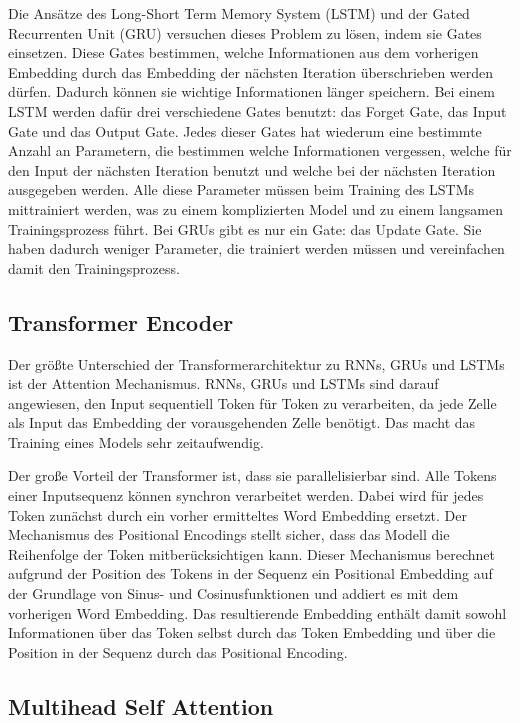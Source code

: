 Die Ansätze des Long-Short Term Memory System (LSTM) und der Gated Recurrenten Unit (GRU) versuchen dieses Problem zu lösen, indem sie Gates einsetzen.
Diese Gates bestimmen, welche Informationen aus dem vorherigen Embedding durch das Embedding der nächsten Iteration überschrieben werden dürfen.
Dadurch können sie wichtige Informationen länger speichern.
Bei einem LSTM werden dafür drei verschiedene Gates benutzt: das Forget Gate, das Input Gate und das Output Gate.
Jedes dieser Gates hat wiederum eine bestimmte Anzahl an Parametern, die bestimmen welche Informationen vergessen, welche für den Input der nächsten Iteration benutzt und welche bei der nächsten Iteration ausgegeben werden.
Alle diese Parameter müssen beim Training des LSTMs mittrainiert werden, was zu einem komplizierten Model und zu einem langsamen Trainingsprozess führt.
Bei GRUs gibt es nur ein Gate: das Update Gate.
Sie haben dadurch weniger Parameter, die trainiert werden müssen und vereinfachen damit den Trainingsprozess.~\cite{pirani2022}

\subsection{Transformer Encoder}

Der größte Unterschied der Transformerarchitektur zu RNNs, GRUs und LSTMs ist der Attention Mechanismus.
RNNs, GRUs und LSTMs sind darauf angewiesen, den Input sequentiell Token für Token zu verarbeiten, da jede Zelle als Input das Embedding der vorausgehenden Zelle benötigt.
Das macht das Training eines Models sehr zeitaufwendig.

Der große Vorteil der Transformer ist, dass sie parallelisierbar sind.
Alle Tokens einer Inputsequenz können synchron verarbeitet werden. 
Dabei wird für jedes Token zunächst durch ein vorher ermitteltes Word Embedding ersetzt.
Der Mechanismus des Positional Encodings stellt sicher, dass das Modell die Reihenfolge der Token mitberücksichtigen kann.
Dieser Mechanismus berechnet aufgrund der Position des Tokens in der Sequenz ein Positional Embedding auf der Grundlage von Sinus- und Cosinusfunktionen und addiert es mit dem vorherigen Word Embedding.
Das resultierende Embedding enthält damit sowohl Informationen über das Token selbst durch das Token Embedding und über die Position in der Sequenz durch das Positional Encoding.


\subsection{Multihead Self Attention}


